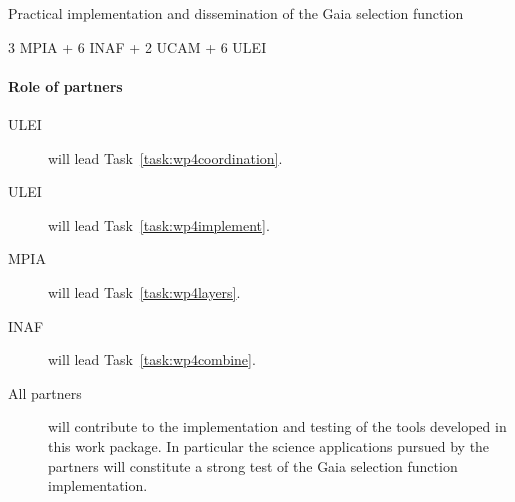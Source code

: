 \begin{workpackage}{Practical implementation and dissemination of the Gaia selection function}
\begin{wpdescription}
{      \textsf{3 MPIA + 6 INAF + 2 UCAM + 6 ULEI \pems}
    }

    \paragraph{Role of partners}
    \begin{description}
      \item[ULEI] will lead Task~\ref{task:wp4coordination}.
      \item[ULEI] will lead Task~\ref{task:wp4implement}.
      \item[MPIA] will lead Task~\ref{task:wp4layers}.
      \item[INAF] will lead Task~\ref{task:wp4combine}.
      \item[All partners] will contribute to the implementation and testing of the tools developed in this work package. In particular the science applications pursued by the partners will constitute a strong test of the Gaia selection function implementation.
    \end{description}
  \end{wpdescription}

  \begin{wpdeliverables}
    \label{dev:wp4prototypev1}
    \label{dev:wp4prototypev2}
    \label{dev:wp4final}
  \end{wpdeliverables}

\end{workpackage}


